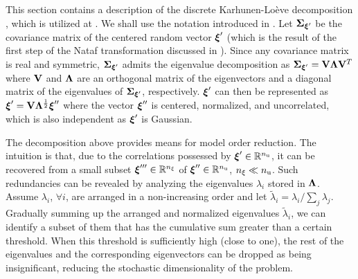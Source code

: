 This section contains a description of the discrete Karhunen-Lo\`{e}ve decomposition \cite{ghanem1991}, which is utilized at .
We shall use the notation introduced in .
Let $\mCov_{\vZ'}$ be the covariance matrix of the centered random vector $\boldsymbol{\xi}'$ (which is the result of the first step of the Nataf transformation discussed in ).
Since any covariance matrix is real and symmetric, $\mCov_{\vZ'}$ admits the eigenvalue decomposition as $\mCov_{\vZ'} = \m{V} \m{\Lambda} \m{V}^T$ where $\m{V}$ and $\m{\Lambda}$ are an orthogonal matrix of the eigenvectors and a diagonal matrix of the eigenvalues of $\mCov_{\vZ'}$, respectively.
$\boldsymbol{\xi}'$ can then be represented as $\vZ' = \m{V} \m{\Lambda}^\frac{1}{2} \vZ''$ where the vector $\boldsymbol{\xi}''$ is centered, normalized, and uncorrelated, which is also independent as $\boldsymbol{\xi}'$ is Gaussian.

The decomposition above provides means for model order reduction.
The intuition is that, due to the correlations possessed by $\boldsymbol{\xi}' \in \mathbb{R}^{n_\text{u}}$, it can be recovered from a small subset $\boldsymbol{\xi}''' \in \mathbb{R}^{n_\xi}$ of $\boldsymbol{\xi}'' \in \mathbb{R}^{n_\text{u}}$, ${n_\xi} \ll {n_\text{u}}$.
Such redundancies can be revealed by analyzing the eigenvalues $\lambda_i$ stored in $\m{\Lambda}$.
Assume $\lambda_i$, $\forall i$, are arranged in a non-increasing order and let $\tilde{\lambda}_i = \lambda_i / \sum_j \lambda_j$.
Gradually summing up the arranged and normalized eigenvalues $\tilde{\lambda}_i$, we can identify a subset of them that has the cumulative sum greater than a certain threshold.
When this threshold is sufficiently high (close to one), the rest of the eigenvalues and the corresponding eigenvectors can be dropped as being insignificant, reducing the stochastic dimensionality of the problem.
